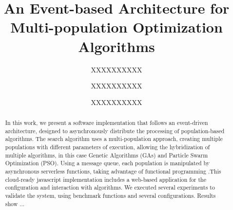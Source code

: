 \documentclass[runningheads]{llncs}
\begin{document}
%
\title{An Event-based Architecture for Multi-population Optimization Algorithms}
%
%
\author{XXXXXXXXXX \and
XXXXXXXXXX \and
XXXXXXXXXX}
%
%
%
\maketitle              %
%
\begin{abstract}
  In this work, we present a software implementation that follows an
  event-driven architecture, designed to asynchronously distribute the
  processing of population-based algorithms. The search algorithm uses a
  multi-population approach, creating multiple populations with different
  parameters of execution, allowing the hybridization of multiple algorithms, in
  this case Genetic Algorithms (GAs) and Particle Swarm Optimization (PSO).
  Using a message queue, each population is manipulated by asynchronous
  serverless functions, taking advantage of functional programming
    .This cloud-ready javascript implementation includes a web-based application for
    the configuration and interaction with algorithms. We executed several
    experiments to validate the system, using benchmark functions and
    several configurations. Results show ...





\end{abstract}
%
%
%
\end{document}
